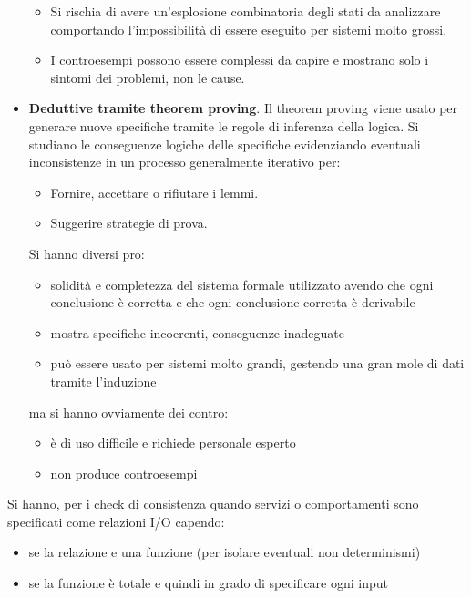 \begin{itemize}
\begin{itemize}
              \item Si rischia di avere un'esplosione combinatoria degli stati da
                    analizzare comportando l'impossibilità di essere eseguito per
                    sistemi molto grossi.
              \item I controesempi possono essere complessi da capire e mostrano
                    solo i sintomi dei problemi, non le cause.
          \end{itemize}
    \item \textbf{Deduttive tramite theorem proving}. Il theorem proving viene
          usato per generare nuove specifiche tramite le regole di inferenza della logica.
          Si studiano le conseguenze logiche delle specifiche evidenziando eventuali
          inconsistenze in un processo generalmente iterativo per:
          \begin{itemize}
              \item Fornire, accettare o rifiutare i lemmi.
              \item Suggerire strategie di prova.
          \end{itemize}
          Si hanno diversi pro:
          \begin{itemize}
              \item solidità e completezza del sistema formale utilizzato avendo
                    che ogni conclusione è corretta e che ogni conclusione corretta è derivabile
              \item mostra specifiche incoerenti, conseguenze inadeguate
              \item può essere usato per sistemi molto grandi, gestendo una gran
                    mole di dati tramite l'induzione
          \end{itemize}
          ma si hanno ovviamente dei contro:
          \begin{itemize}
              \item è di uso difficile e richiede personale esperto
              \item non produce controesempi
          \end{itemize}
\end{itemize}
Si hanno, per i check di consistenza quando servizi o comportamenti sono specificati
come relazioni I/O capendo:
\begin{itemize}
    \item se la relazione e una funzione (per isolare eventuali non determinismi)
    \item se la funzione è totale e quindi in grado di specificare ogni input
\end{itemize}
